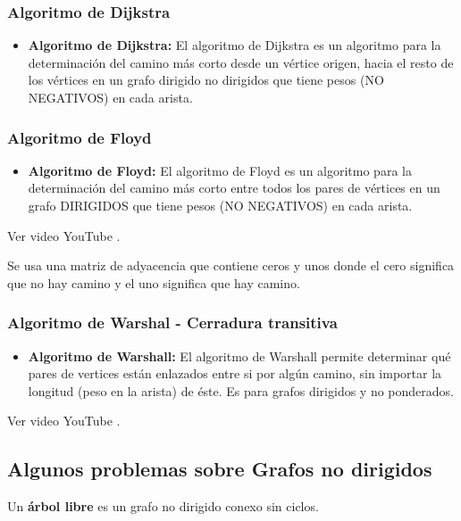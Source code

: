 \documentclass[../main.tex]{subfiles}
\begin{document}
            \subsubsection{Algoritmo de Dijkstra}
                \begin{itemize}
                    \item \textbf{Algoritmo de Dijkstra:} El algoritmo de Dijkstra es un algoritmo para la determinación del camino más corto desde un vértice origen, hacia el resto de los vértices en un grafo dirigido no dirigidos que tiene pesos (NO NEGATIVOS) en cada arista.
                \end{itemize}

            \subsubsection{Algoritmo de Floyd}
                \begin{itemize}
                    \item \textbf{Algoritmo de Floyd:} El algoritmo de Floyd es un algoritmo para la determinación del camino más corto entre todos los pares de vértices en un grafo DIRIGIDOS que tiene pesos (NO NEGATIVOS) en cada arista.
                \end{itemize}

                Ver video YouTube \cite{algoritmo_floyd_youtube_1}.

                Se usa una matriz de adyacencia que contiene ceros y unos donde el cero significa que no hay camino y el uno significa que hay camino.\\

            \subsubsection{Algoritmo de Warshal - Cerradura transitiva}
                \begin{itemize}
                    \item \textbf{Algoritmo de Warshall:} El algoritmo de Warshall permite determinar qué pares de vertices están enlazados entre si por algún camino, sin importar la longitud (peso en la arista) de éste. Es para grafos dirigidos y no ponderados.
                \end{itemize}
            
                Ver video YouTube \cite{grafo_algoritmo_warshall_youtube_1}.

        \subsection{Algunos problemas sobre Grafos no dirigidos}
            Un \textbf{árbol libre} es un grafo no dirigido conexo sin ciclos.\\
            
\end{document}

